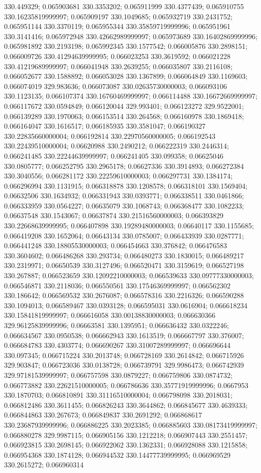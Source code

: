 330.449329; 0.065903681 330.3353202; 0.065911999 330.4377439; 0.065910755 330.16235819999997; 0.065909197 330.1049685; 0.065932719 330.2431752; 0.065951144 330.3370119; 0.065955344 330.35859719999996; 0.065951961 330.3141416; 0.065972948 330.42662989999997; 0.065973689 330.16402869999996; 0.065981892 330.2193198; 0.065992345 330.1577542; 0.066005876 330.2898151; 0.066009726 330.41294639999995; 0.066023253 330.3619592; 0.066021228 330.41219689999997; 0.066041948 330.2639255; 0.066035807 330.2116108; 0.066052677 330.1588892; 0.066053028 330.1367899; 0.066064849 330.1169603; 0.066074019 329.983636; 0.066073087 330.02635730000003; 0.066093106 330.1123135; 0.066107374 330.16760469999997; 0.066114488 330.16672669999997; 0.066117672 330.0594849; 0.066120044 329.993401; 0.066123272 329.9522001; 0.066139289 330.1970063; 0.066153514 330.264568; 0.066160978 330.1869418; 0.066164047 330.1616517; 0.066185935 330.3581047; 0.066190327 330.22835660000004; 0.066192814 330.22970560000005; 0.066192543 330.22439510000004; 0.06620988 330.2490212; 0.066222319 330.2446314; 0.066241485 330.22244639999997; 0.066241405 330.099358; 0.06625046 330.0805777; 0.066252795 330.2965178; 0.06627336 330.3914893; 0.066272384 330.3040556; 0.066281172 330.22259610000003; 0.066297731 330.1384174; 0.066296994 330.1131915; 0.066318878 330.1208578; 0.066318101 330.1569404; 0.06632506 330.1634932; 0.066331943 330.0393771; 0.066338511 330.0461866; 0.066333959 330.0564227; 0.06635079 330.1068743; 0.066368477 330.1082233; 0.06637548 330.1543067; 0.06637874 330.21516560000003; 0.066393829 330.22668639999995; 0.066407898 330.19289480000003; 0.06640117 330.1155685; 0.066419208 330.1652064; 0.06643134 330.0785007; 0.066433939 330.0287771; 0.066441248 330.18805530000003; 0.066454663 330.376842; 0.066476583 330.3604602; 0.066486268 330.293734; 0.066480273 330.1830015; 0.066489217 330.2319971; 0.06650539 330.3127496; 0.066520471 330.3159619; 0.066527198 330.267887; 0.066523659 330.12092210000003; 0.066539633 330.09777330000003; 0.066546871 330.2118036; 0.066550561 330.17546369999997; 0.066562302 330.186642; 0.066569532 330.2676087; 0.066578316 330.2216326; 0.066590288 330.1094013; 0.066589467 330.0393128; 0.066595031 330.0616904; 0.066618234 330.15841819999997; 0.066616058 330.00138830000003; 0.066630366 329.96125839999996; 0.06663581 330.1395951; 0.066636432 330.0322246; 0.066634567 330.0950538; 0.066662943 330.1613519; 0.066667797 330.376007; 0.066684783 330.4303774; 0.066690267 330.31007289999997; 0.066696644 330.097345; 0.066715224 330.2013748; 0.066728169 330.2614842; 0.066715926 329.903847; 0.066723036 330.0138728; 0.066739791 329.9986473; 0.066742939 329.97181539999997; 0.066757598 330.0879227; 0.066759806 330.0874732; 0.066773882 330.22621510000005; 0.066786636 330.35771919999996; 0.0667953 330.1870703; 0.066810891 330.31116510000004; 0.066798098 330.2018031; 0.066812486 330.3611455; 0.066826243 330.3644862; 0.066845677 330.4639333; 0.066844863 330.267673; 0.066849837 330.2691292; 0.066868617 330.23687939999996; 0.066886225 330.2023385; 0.066885603 330.08173419999997; 0.066880278 329.9987115; 0.066905156 330.1212218; 0.066907443 330.2551457; 0.066923815 330.2698145; 0.066922062 330.1362331; 0.066928088 330.1215858; 0.066954368 330.1874128; 0.066944532 330.14477739999995; 0.066969529 330.2615272; 0.066960314 